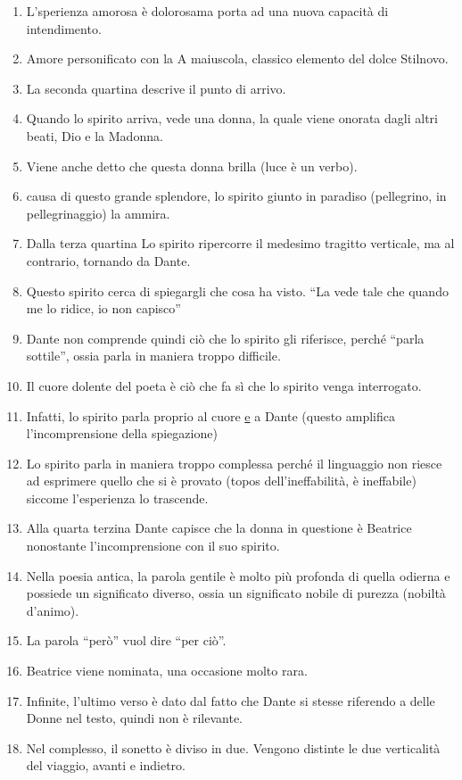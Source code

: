 \documentclass{article}
\begin{document}
\begin{enumerate}
    \item L'sperienza amorosa è dolorosama porta ad una nuova capacità di intendimento. 
    \item Amore personificato con la A maiuscola, classico elemento del dolce Stilnovo.
    \item La seconda quartina descrive il punto di arrivo.
    \item Quando lo spirito arriva, vede una donna, la quale viene
    onorata dagli altri beati, Dio e la Madonna.
    \item Viene anche detto che questa donna brilla (luce è un verbo).
    \item causa di questo grande splendore, lo spirito giunto in paradiso (pellegrino, in pellegrinaggio) la ammira.
    \item Dalla terza quartina Lo spirito ripercorre il medesimo tragitto verticale, ma al contrario, tornando da Dante.
    \item Questo spirito cerca di spiegargli che cosa ha visto. “La vede tale che quando me lo ridice, io non capisco”
    \item Dante non comprende
    quindi ciò che lo spirito gli riferisce, perché “parla sottile”, ossia parla in maniera troppo difficile.
    \item Il cuore dolente del poeta è ciò che fa sì che lo spirito venga interrogato.
    \item Infatti, lo spirito parla proprio al cuore \underline{e} a
    Dante (questo amplifica l’incomprensione della spiegazione)
    \item Lo spirito parla in maniera troppo complessa
    perché il linguaggio non riesce ad esprimere quello che si è provato (topos dell’ineffabilità, è ineffabile) siccome
    l’esperienza lo trascende.
    \item Alla quarta terzina Dante capisce che la donna in questione è Beatrice nonostante l'incomprensione con il suo spirito.
    \item Nella poesia antica, la parola gentile è molto più profonda di quella odierna e possiede un significato diverso, ossia un significato nobile di purezza (nobiltà d'animo).
    \item La parola ``però'' vuol dire ``per ciò''. 
    \item Beatrice viene nominata, una occasione molto rara.
    \item Infinite, l'ultimo verso è dato dal fatto che Dante si stesse riferendo a delle Donne nel testo, quindi non è rilevante.
    \item Nel complesso, il sonetto è diviso in due. Vengono distinte le due verticalità del viaggio, avanti e indietro.

\end{enumerate}
\end{document}

